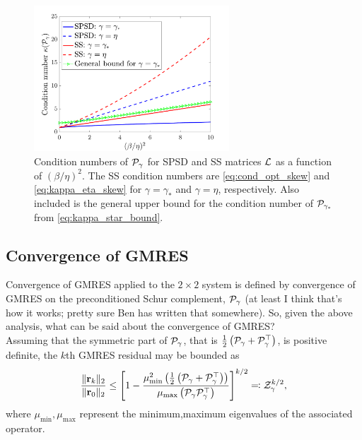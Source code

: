 \documentclass[a4paper,10pt]{article}
\begin{document}
{\begin{figure}[!htb]
\label{fig:conds_all}
\centering
\includegraphics[width=0.65\textwidth]{figures/conds_spsd_ss}
\caption{Condition numbers of ${\cal P}_{\gamma}$ for SPSD and SS matrices ${\cal L}$ as a function of $(\beta/\eta)^2$. The SS condition numbers are \eqref{eq:cond_opt_skew} and \eqref{eq:kappa_eta_skew} for $\gamma = \gamma_*$ and $\gamma = \eta$, respectively. Also included is the general upper bound for the condition number of ${\cal P}_{\gamma_*}$ from \eqref{eq:kappa_star_bound}.}
\end{figure}

\subsection{Convergence of GMRES}

Convergence of GMRES applied to the $2 \times 2$ system is defined by convergence of GMRES on the preconditioned Schur complement, ${\cal P}_{\gamma}$ (at least I think that's how it works; pretty sure Ben has written that somewhere). So, given the above analysis, what can be said about the convergence of GMRES? \\

Assuming that the symmetric part of ${\cal P}_{\gamma}$, that is $\tfrac{1}{2}\left({\cal P}_{\gamma} +  {\cal P}_{\gamma}^\top \right)$, is positive definite, the $k$th GMRES residual may be bounded as
\begin{align} 
\label{eq:gmres_eig_bound}
\frac{\Vert \mathbf{r}_k \Vert_2}{\Vert \mathbf{r}_0 \Vert_2} \leq
\left[1 -  \frac{\mu_{\min}^2 \left( \tfrac{1}{2} \left( {\cal P}_{\gamma} +  {\cal P}_{\gamma}^\top \right) \right)}{\mu_{\max} \left( {\cal P}_{\gamma} {\cal P}_{\gamma}^\top \right)}  \right]^{k/2} \eqqcolon {\cal Z}_{\gamma}^{k/2},
\end{align}
where $\mu_{\min},\mu_{\max}$ represent  the minimum,maximum eigenvalues of the associated operator.

}
\end{document}

